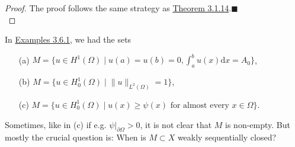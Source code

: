 \begin{proof}
The proof follows the same strategy as \hyperlink{theorem_3_1_14}{Theorem 3.1.14}.\hfill$\blacksquare$\\[11pt]
\end{proof}


In \hyperlink{examples_3_6_1}{Examples 3.6.1}, we had the sets
\begin{itemize}
	\item[(a)] $M=\{u\in H^1(\Omega)\mid u(a)=u(b)=0,\int_a^b{u(x)\mathrm{d}x}=A_0\}$,
	\item[(b)] $M=\{u\in H_0^1(\Omega)\mid\lVert u\rVert_{L^2(\Omega)}=1\}$,
	\item[(c)] $M=\{u\in H_0^1(\Omega)\mid u(x)\geq\psi(x)\text{ for almost every }x\in\Omega\}$.
\end{itemize}
Sometimes, like in (c) if e.g. $\psi\vert_{\partial\Omega}>0$, it is not clear that $M$ is non-empty. But mostly the crucial question is: When is $M\subset X$ weakly sequentially closed?\\[11pt]

